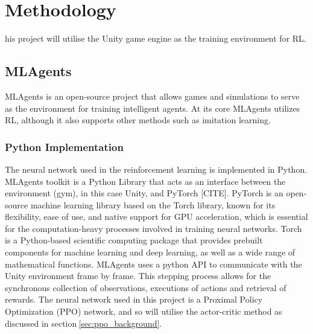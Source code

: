 
%
\let\textcircled=\pgftextcircled\chapter{Methodology}


his project will utilise the Unity game engine as the training environment for RL\@.


\section{MLAgents}
MLAgents is an open-source project that allows games and simulations to serve as the environment for training intelligent agents. At its core MLAgents utilizes RL, although it also supports other methods such as imitation learning.

\subsection{Python Implementation}
The neural network used in the reinforcement learning is implemented in Python. MLAgents toolkit is a Python Library that acts as an interface between the environment (gym), in this case Unity, and PyTorch [CITE]. PyTorch is an open-source machine learning library based on the Torch library, known for its flexibility, ease of use, and native support for GPU acceleration, which is essential for the computation-heavy processes involved in training neural networks. Torch is a Python-based scientific computing package that provides prebuilt components for machine learning and deep learning, as well as a wide range of mathematical functions. MLAgents uses a python API to communicate with the Unity environment frame by frame. This stepping process allows for the synchronous collection of observations, executions of actions and retrieval of rewards. The neural network used in this project is a Proximal Policy Optimization (PPO) network, and so will utilise the actor-critic method as discussed in section$~$\ref{sec:ppo_background}.

